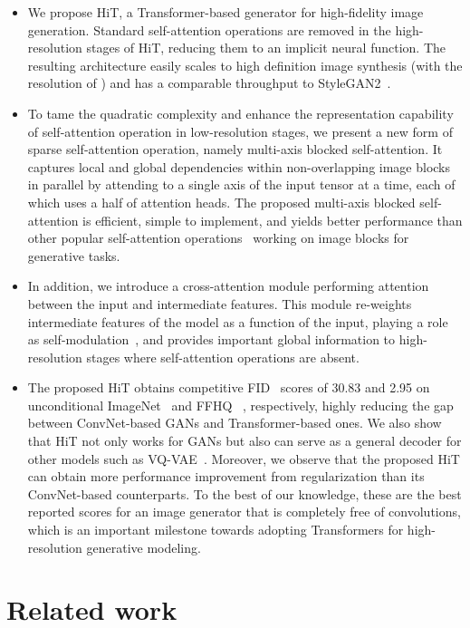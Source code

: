 \documentclass{article}
\begin{document}
\begin{itemize}[leftmargin=7.5mm]
    \setlength\itemsep{0.3em}
    \item We propose HiT, a Transformer-based generator for  high-fidelity image generation. Standard self-attention operations are removed in the high-resolution stages of HiT, reducing them to an implicit neural function. The resulting architecture easily scales to high definition image synthesis (with the resolution of ) and has a comparable throughput to StyleGAN2~\cite{karras2020analyzing}.
    
    \item To tame the quadratic complexity and enhance the representation capability of self-attention operation in low-resolution stages, we present a new form of sparse self-attention operation, namely multi-axis blocked self-attention. It captures local and global dependencies within non-overlapping image blocks in parallel by attending to a single axis of the input tensor at a time, each of which uses a half of attention heads. The proposed multi-axis blocked self-attention is efficient, simple to implement, and yields better performance than other popular self-attention operations~\cite{liu2021swin,vaswani2021scaling,zhang2021aggregating} working on image blocks for generative tasks.
    
    \item In addition, we introduce a cross-attention module performing attention between the input and intermediate features. This module  re-weights intermediate features of the model as a function of the input, playing a role as self-modulation~\cite{chen2019self}, and provides important global information to high-resolution stages where self-attention operations are absent.
    
    \item The proposed HiT obtains competitive FID~\cite{heusel2017gans} scores of 30.83 and 2.95 on unconditional ImageNet~\cite{russakovsky2015imagenet}  and FFHQ~\cite{karras2020analyzing} , respectively, highly reducing the gap between ConvNet-based GANs and Transformer-based ones. We also show that HiT not only works for GANs but also can serve as a general decoder for other models such as VQ-VAE~\cite{van2017neural}. Moreover, we observe that the proposed HiT can obtain more performance improvement from regularization than its ConvNet-based counterparts. To the best of our knowledge, these are the best reported scores for an image generator that is completely free of convolutions, which is an important milestone towards adopting Transformers for high-resolution generative modeling.
\end{itemize} \section{Related work}
\end{document}
